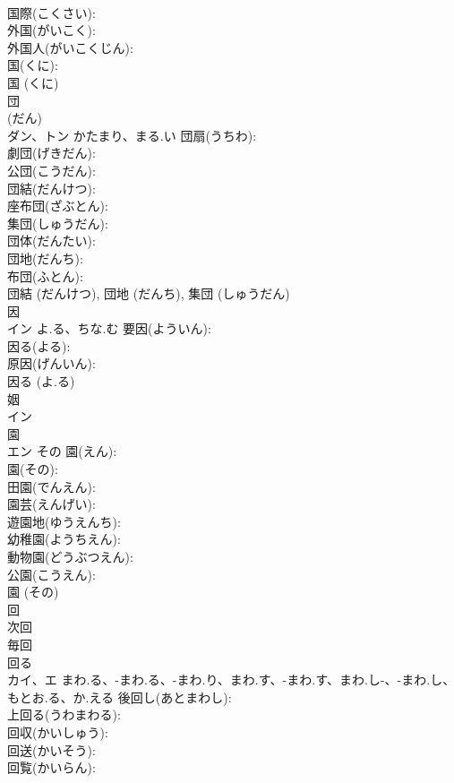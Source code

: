 \documentclass[8pt]{extreport}
\begin{document}
\begin{CJK}{UTF8}{min}
\\	国際(こくさい): 
\\	外国(がいこく): 
\\	外国人(がいこくじん): 
\\	国(くに): 
\\	国 (くに)
\\	団			
\\	(だん) 
\\	ダン、トン	かたまり、まる.い	団扇(うちわ): 
\\	劇団(げきだん): 
\\	公団(こうだん): 
\\	団結(だんけつ): 
\\	座布団(ざぶとん): 
\\	集団(しゅうだん): 
\\	団体(だんたい): 
\\	団地(だんち): 
\\	布団(ふとん): 
\\	団結 (だんけつ), 団地 (だんち), 集団 (しゅうだん)
\\	因			
\\	イン	よ.る、ちな.む	要因(よういん): 
\\	因る(よる): 
\\	原因(げんいん): 
\\	因る (よ.る)
\\	姻			
\\	イン			
\\	園			
\\	エン	その	園(えん): 
\\	園(その): 
\\	田園(でんえん): 
\\	園芸(えんげい): 
\\	遊園地(ゆうえんち): 
\\	幼稚園(ようちえん): 
\\	動物園(どうぶつえん): 
\\	公園(こうえん): 
\\	園 (その)
\\	回			
\\	次回 
\\	毎回 
\\	回る 
\\	カイ、エ	まわ.る、-まわ.る、-まわ.り、まわ.す、-まわ.す、まわ.し-、-まわ.し、もとお.る、か.える	後回し(あとまわし): 
\\	上回る(うわまわる): 
\\	回収(かいしゅう): 
\\	回送(かいそう): 
\\	回覧(かいらん): 

\end{CJK}
\end{document}
